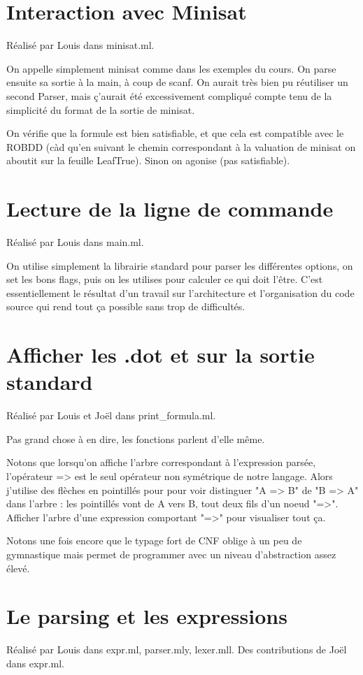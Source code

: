 \documentclass[a4paper,10pt]{article}
\begin{document}
\section{Interaction avec Minisat}
Réalisé par Louis dans minisat.ml.

On appelle simplement minisat comme dans les exemples du cours. On parse ensuite sa sortie à la main, à coup de scanf. On aurait très bien pu réutiliser un second Parser, mais ç'aurait été excessivement compliqué compte tenu de la simplicité du format de la sortie de minisat.  
  
On vérifie que la formule est bien satisfiable, et que cela est compatible avec le ROBDD (càd qu'en suivant le chemin correspondant à la valuation de minisat on aboutit sur la feuille LeafTrue). Sinon on agonise (pas satisfiable).

\section{Lecture de la ligne de commande}
Réalisé par Louis dans main.ml.

On utilise simplement la librairie standard pour parser les différentes options, on set les bons flags, puis on les utilises pour calculer ce qui doit l'être. C'est essentiellement le résultat d'un travail sur l'architecture et l'organisation du code source qui rend tout ça possible sans trop de difficultés.

\section{Afficher les .dot et sur la sortie standard}
Réalisé par Louis et Joël dans print\_formula.ml.

Pas grand chose à en dire, les fonctions parlent d'elle même.

Notons que lorsqu'on affiche l'arbre correspondant à l'expression parsée, l'opérateur => est le seul opérateur non symétrique de notre langage. Alors j'utilise des flèches en pointillés pour pour voir distinguer "A => B" de "B => A" dans l'arbre : les pointillés vont de A vers B, tout deux fils d'un noeud "=>". Afficher l'arbre d'une expression comportant "=>" pour visualiser tout ça.

Notons une fois encore que le typage fort de CNF oblige à un peu de gymnastique mais permet de programmer avec un niveau d'abstraction assez élevé.

\section{Le parsing et les expressions}
Réalisé par Louis dans expr.ml, parser.mly, lexer.mll. Des contributions de Joël dans expr.ml.
\end{document}
